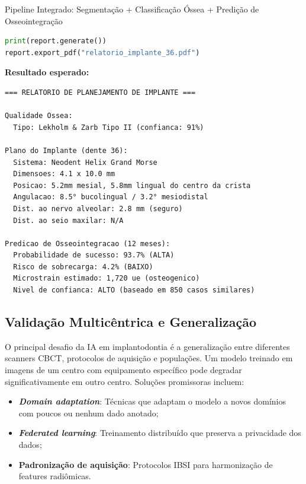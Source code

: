 \begin{pratica}{Pipeline Integrado: Segmentação + Classificação Óssea + Predição de Osseointegração}
\begin{lstlisting}[language=Python, caption={Pipeline completo de implantodontia assistida por IA}]
print(report.generate())
report.export_pdf("relatorio_implante_36.pdf")
\end{lstlisting}

\textbf{Resultado esperado:}
\begin{lstlisting}[style=saida]
=== RELATORIO DE PLANEJAMENTO DE IMPLANTE ===

Qualidade Ossea:
  Tipo: Lekholm & Zarb Tipo II (confianca: 91%)

Plano do Implante (dente 36):
  Sistema: Neodent Helix Grand Morse
  Dimensoes: 4.1 x 10.0 mm
  Posicao: 5.2mm mesial, 5.8mm lingual do centro da crista
  Angulacao: 8.5° bucolingual / 3.2° mesiodistal
  Dist. ao nervo alveolar: 2.8 mm (seguro)
  Dist. ao seio maxilar: N/A

Predicao de Osseointegracao (12 meses):
  Probabilidade de sucesso: 93.7% (ALTA)
  Risco de sobrecarga: 4.2% (BAIXO)
  Microstrain estimado: 1,720 ue (osteogenico)
  Nivel de confianca: ALTO (baseado em 850 casos similares)
\end{lstlisting}
\end{pratica}


\subsection{Validação Multicêntrica e Generalização}

O principal desafio da IA em implantodontia é a generalização entre diferentes scanners CBCT, protocolos de aquisição e populações. Um modelo treinado em imagens de um centro com equipamento específico pode degradar significativamente em outro centro. Soluções promissoras incluem:
\begin{itemize}
    \item \textbf{\textit{Domain adaptation}}: Técnicas que adaptam o modelo a novos domínios com poucos ou nenhum dado anotado;
    \item \textbf{\textit{Federated learning}}: Treinamento distribuído que preserva a privacidade dos dados;
    \item \textbf{Padronização de aquisição}: Protocolos IBSI para harmonização de features radiômicas.
\end{itemize}


